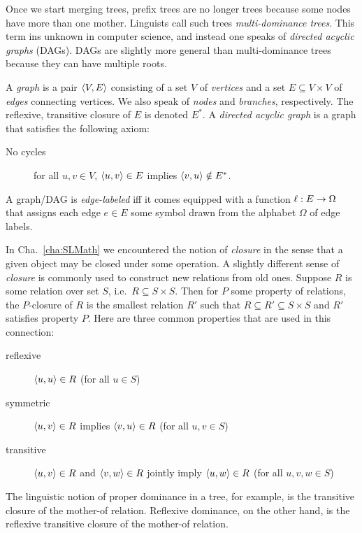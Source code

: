 Once we start merging trees, prefix trees are no longer trees because some nodes have more than one mother.
Linguists call such trees \emph{multi-dominance trees}.
This term ins unknown in computer science, and instead one speaks of \emph{directed acyclic graphs} (DAGs).
DAGs are slightly more general than multi-dominance trees because they can have multiple roots.
%
\begin{definition}[DAG]
    A \emph{graph} is a pair $\left \langle V,E \right \rangle $ consisting of a set $V$ of \emph{vertices} and a set $E \subseteq V \times V $ of \emph{edges} connecting vertices.
    We also speak of \emph{nodes} and \emph{branches}, respectively.
    The reflexive, transitive closure of $E$ is denoted $E^*$.
    A \emph{directed acyclic graph} is a graph that satisfies the following axiom:
    \begin{description}
        \item[No cycles] for all $u,v \in V$, $\left \langle u,v \right \rangle  \in E$ implies $\left \langle v,u \right \rangle  \notin E^*$.
    \end{description}
    A graph\slash DAG is \emph{edge-labeled} iff it comes equipped with a function $\ell: E \rightarrow \Omega$ that assigns each edge $e \in E$ some symbol drawn from the alphabet $\Omega$ of edge labels.
\end{definition}
%
\begin{techinfo}
    In Cha.~\ref{cha:SLMath} we encountered the notion of \emph{closure} in the sense that a given object may be closed under some operation.
    A slightly different sense of \emph{closure} is commonly used to construct new relations from old ones.
    Suppose $R$ is some relation over set $S$, i.e.\ $R \subseteq S \times S$.
    Then for $P$ some property of relations, the $P$-closure of $R$ is the smallest relation $R'$ such that $R \subseteq R' \subseteq S \times S$ and $R'$ satisfies property $P$.
    Here are three common properties that are used in this connection:
    \begin{description}
        \item[reflexive] $\left \langle u,u \right \rangle  \in R$ (for all $u \in S$)
        \item[symmetric] $\left \langle u,v \right \rangle  \in R$ implies $\left \langle v,u \right \rangle  \in R$ (for all $u,v \in S$)
        \item[transitive] $\left \langle u,v \right \rangle  \in R$ and $\left \langle v,w \right \rangle  \in R$ jointly imply $\left \langle u,w \right \rangle  \in R$ (for all $u,v,w \in S$)
    \end{description}
    The linguistic notion of proper dominance in a tree, for example, is the transitive closure of the mother-of relation.
    Reflexive dominance, on the other hand, is the reflexive transitive closure of the mother-of relation.
\end{techinfo}

